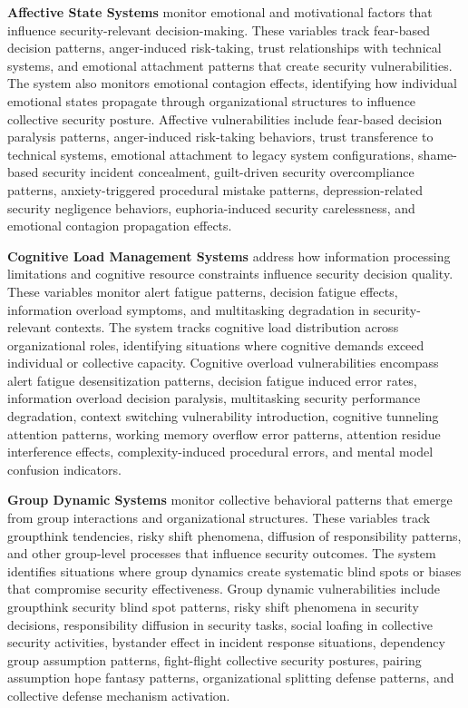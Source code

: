 \documentclass[journal]{IEEEtran}
\begin{document}
\textbf{Affective State Systems} monitor emotional and motivational factors that influence security-relevant decision-making. These variables track fear-based decision patterns, anger-induced risk-taking, trust relationships with technical systems, and emotional attachment patterns that create security vulnerabilities. The system also monitors emotional contagion effects, identifying how individual emotional states propagate through organizational structures to influence collective security posture. Affective vulnerabilities include fear-based decision paralysis patterns, anger-induced risk-taking behaviors, trust transference to technical systems, emotional attachment to legacy system configurations, shame-based security incident concealment, guilt-driven security overcompliance patterns, anxiety-triggered procedural mistake patterns, depression-related security negligence behaviors, euphoria-induced security carelessness, and emotional contagion propagation effects.

\textbf{Cognitive Load Management Systems} address how information processing limitations and cognitive resource constraints influence security decision quality. These variables monitor alert fatigue patterns, decision fatigue effects, information overload symptoms, and multitasking degradation in security-relevant contexts. The system tracks cognitive load distribution across organizational roles, identifying situations where cognitive demands exceed individual or collective capacity. Cognitive overload vulnerabilities encompass alert fatigue desensitization patterns, decision fatigue induced error rates, information overload decision paralysis, multitasking security performance degradation, context switching vulnerability introduction, cognitive tunneling attention patterns, working memory overflow error patterns, attention residue interference effects, complexity-induced procedural errors, and mental model confusion indicators.

\textbf{Group Dynamic Systems} monitor collective behavioral patterns that emerge from group interactions and organizational structures. These variables track groupthink tendencies, risky shift phenomena, diffusion of responsibility patterns, and other group-level processes that influence security outcomes. The system identifies situations where group dynamics create systematic blind spots or biases that compromise security effectiveness. Group dynamic vulnerabilities include groupthink security blind spot patterns, risky shift phenomena in security decisions, responsibility diffusion in security tasks, social loafing in collective security activities, bystander effect in incident response situations, dependency group assumption patterns, fight-flight collective security postures, pairing assumption hope fantasy patterns, organizational splitting defense patterns, and collective defense mechanism activation.
\end{document}
